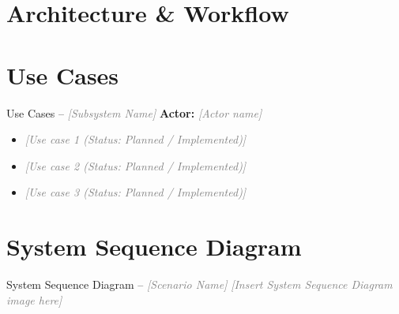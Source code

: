 \documentclass[11pt,aspectratio=169]{beamer}
\newcommand{\fillin}[1]{\textcolor{gray}{\itshape [#1]}}
\begin{document}
\section{Architecture \& Workflow}


\section{Use Cases}

\begin{frame}{Use Cases -- \fillin{Subsystem Name}}
\textbf{Actor:} \fillin{Actor name}
\vspace{0.5em}
\begin{itemize}
  \item \fillin{Use case 1 (Status: Planned / Implemented)}
  \item \fillin{Use case 2 (Status: Planned / Implemented)}
  \item \fillin{Use case 3 (Status: Planned / Implemented)}
\end{itemize}
\end{frame}


\section{System Sequence Diagram}

\begin{frame}{System Sequence Diagram -- \fillin{Scenario Name}}
\centering
\fillin{Insert System Sequence Diagram image here}
\end{frame}
\end{document}
